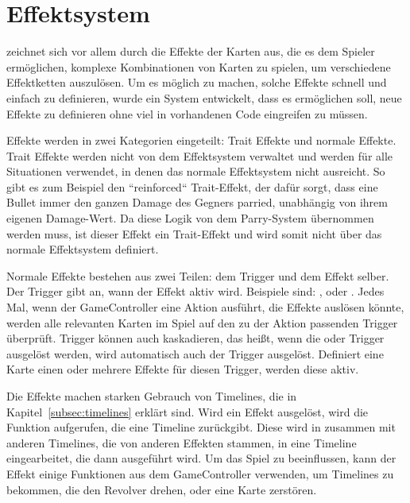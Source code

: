 
\section{Effektsystem}\label{sec:effectsystem}

\renewcommand{\kapitelautor}{Autor: Marvin Kurka}

\FF zeichnet sich vor allem durch die Effekte der Karten aus, die es dem Spieler ermöglichen, komplexe Kombinationen
von Karten zu spielen, um verschiedene Effektketten auszulösen.
Um es möglich zu machen, solche Effekte schnell und einfach zu definieren, wurde ein System entwickelt, dass es
ermöglichen soll, neue Effekte zu definieren ohne viel in vorhandenen Code eingreifen zu müssen.

Effekte werden in zwei Kategorien eingeteilt: Trait Effekte und normale Effekte.
Trait Effekte werden nicht von dem Effektsystem verwaltet und werden für alle Situationen verwendet, in denen das
normale Effektsystem nicht ausreicht.
So gibt es zum Beispiel den ``reinforced`` Trait-Effekt, der dafür sorgt, dass eine Bullet immer den ganzen Damage
des Gegners parried, unabhängig von ihrem eigenen Damage-Wert.
Da diese Logik von dem Parry-System übernommen werden muss, ist dieser Effekt ein Trait-Effekt und wird somit nicht
über das normale Effektsystem definiert.

Normale Effekte bestehen aus zwei Teilen: dem Trigger und dem Effekt selber.
Der Trigger gibt an, wann der Effekt aktiv wird.
Beispiele sind: ,  oder .
Jedes Mal, wenn der GameController eine Aktion ausführt, die Effekte auslösen könnte, werden alle relevanten Karten
im Spiel auf den zu der Aktion passenden Trigger überprüft.
Trigger können auch kaskadieren, das heißt, wenn \zB die  oder 
Trigger ausgelöst werden, wird automatisch auch der  Trigger ausgelöst.
Definiert eine Karte einen oder mehrere Effekte für diesen Trigger, werden diese aktiv.

Die Effekte machen starken Gebrauch von Timelines, die in Kapitel~\ref{subsec:timelines} erklärt sind.
Wird ein Effekt ausgelöst, wird die  Funktion aufgerufen, die eine Timeline zurückgibt.
Diese wird in zusammen mit anderen Timelines, die \zB von anderen Effekten stammen, in eine Timeline eingearbeitet,
die dann ausgeführt wird.
Um das Spiel zu beeinflussen, kann der Effekt einige Funktionen aus dem GameController verwenden, um Timelines
zu bekommen, die \zB den Revolver drehen, oder eine Karte zerstören.

